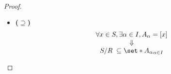 \begin{proof}
\begin{enumerate}[label=\textbf{(\Alph*)}]
\begin{itemize}
\[\begin{array}{c}
                      \exists x \in A_{\alpha} \subseteq S        \\
                      \Downarrow                                  \\
                      A_{\alpha} = [x]                            \\
                      \Downarrow                                  \\
                      \set*{A_{\alpha}}_{\alpha \in I} \subseteq S / \sim
                    \end{array}
                  \]
            \item \textbf{($\supseteq$)}
                  \[
                    \begin{array}{c}
                      \forall x \in S, \exists \alpha \in I, A_{\alpha} = [x] \\
                      \Downarrow                                              \\
                      S / R \; \subseteq \set*{A_{\alpha}}_{\alpha \in I}
                    \end{array}
                  \]
          \end{itemize}
  \end{enumerate}
\end{proof}

